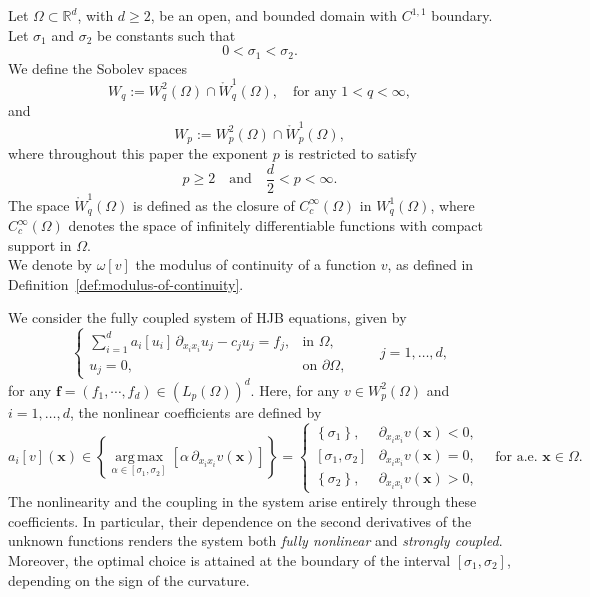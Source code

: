 \documentclass[final,onefignum,onetabnum]{mousaviart}
\begin{document}
	Let $\Omega \subset \mathbb{R}^d$, with $d \ge 2$, be an open, and bounded domain with $C^{1,1}$ boundary. 
	Let $\sigma_1$ and $\sigma_2$ be constants such that 
	\[0 < \sigma_1 < \sigma_2.\]
	We define the Sobolev spaces
	\[
	W_q := W^{2}_q(\Omega) \cap  \mathring{W}^{1}_{q}(\Omega), \quad \text{for any } 1 < q < \infty,
	\]
	and
	\[
	W_p := W^{2}_p(\Omega) \cap \mathring{W}^{1}_p(\Omega),
	\]
	where throughout this paper the exponent $p$ is restricted to satisfy
	\begin{equation}
		\label{ineq:exponent-p}
		 p \geq 2 \quad \text{and} \quad \frac{d}{2} < p < \infty.
	\end{equation}
{\color{red} 
	The space $\mathring{W}^{1}_{q}(\Omega)$ is defined as the closure of $C_c^\infty(\Omega)$ in $W_q^1(\Omega)$, where $C_c^\infty(\Omega)$ denotes the space of infinitely differentiable functions with compact support in $\Omega$.
}
	\\
	We denote by $\omega[v]$ the modulus of continuity of a function $v$, as defined in Definition~\ref{def:modulus-of-continuity}.
	
	We consider the fully coupled system of HJB equations, given by
	\begin{equation}
		\label{coupled-HJB-main}
		\begin{cases}
			\displaystyle
			\sum_{i=1}^{d} a_i[u_i]\, \partial_{x_i x_i} u_j - c_j u_j = f_j,
			& \text{in } \Omega, \\[0.5em]
			u_j = 0,
			& \text{on } \partial\Omega,
		\end{cases}
		\qquad j=1,\dots,d ,
	\end{equation}
	for any $\boldsymbol{f} = \left( f_1, \cdots, f_d \right)  \in (L_p(\Omega))^d$. Here, for any $v\in W^{2}_p(\Omega)$ and $i=1,\dots,d$, 
	the nonlinear coefficients are defined by
	\[
	a_i[v](\boldsymbol{x})
	\in
	\left\lbrace \operatorname*{arg\,max}_{\alpha \in [\sigma_1,\sigma_2]}
	\left[  \alpha \, \partial_{x_i x_i} v (\boldsymbol{x}) \right] \right\rbrace 
	=
	\begin{cases}
		\left\lbrace \sigma_1\right\rbrace , & \partial_{x_i x_i} v(\boldsymbol{x}) < 0, \\
		[\sigma_1, \sigma_2] & \partial_{x_i x_i} v(\boldsymbol{x}) = 0,
		\\
		\left\lbrace \sigma_2 \right\rbrace , & \partial_{x_i x_i} v(\boldsymbol{x}) > 0,
	\end{cases} 
	\quad \text{for a.e.\ } \boldsymbol{x}\in\Omega .
	\]
	The nonlinearity and the coupling in the system arise entirely through these coefficients. In particular, their dependence on the second derivatives of the unknown functions renders the system both \textit{fully nonlinear} and \textit{ strongly coupled}. 
	{\color{red}
		Moreover, the optimal choice is attained at the boundary of the interval $[\sigma_1, \sigma_2]$, depending on the sign of the curvature.
	}
	
\end{document}
